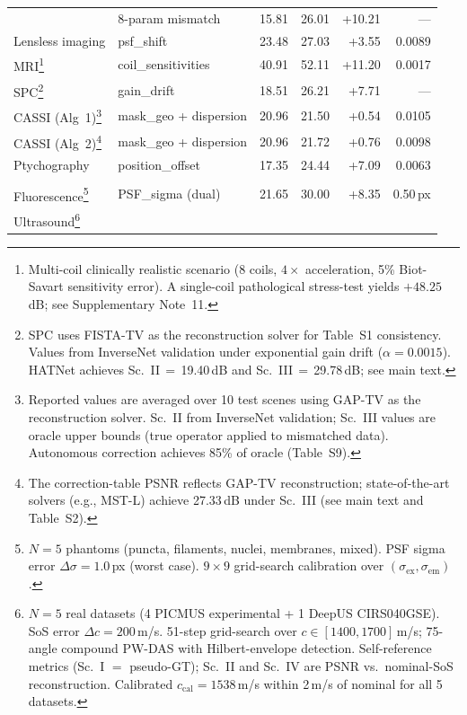 \documentclass[11pt]{article}
\begin{document}
\begin{longtable}{>{\raggedright}p{2.0cm} >{\raggedright}p{2.8cm}
                  r r r r}
  & 8-param mismatch
  & 15.81 & 26.01 & +10.21
  & --- \\
Lensless imaging
  & psf\_shift
  & 23.48 & 27.03 & +3.55
  & 0.0089 \\
MRI\footnote{Multi-coil clinically realistic scenario (8 coils, $4\times$ acceleration, 5\% Biot-Savart sensitivity error). A single-coil pathological stress-test yields $+48.25$\,dB; see Supplementary Note~11.}
  & coil\_sensitivities
  & 40.91 & 52.11 & +11.20
  & 0.0017 \\
SPC\footnote{SPC uses FISTA-TV as the reconstruction solver for Table~S1 consistency.  Values from InverseNet validation under exponential gain drift ($\alpha{=}0.0015$).  HATNet achieves Sc.~II$\,=\,$19.40\,dB and Sc.~III$\,=\,$29.78\,dB; see main text.}
  & gain\_drift
  & 18.51 & 26.21 & +7.71
  & --- \\
CASSI (Alg~1)\footnote{Reported values are averaged over 10 test scenes using GAP-TV as the reconstruction solver. Sc.~II from InverseNet validation; Sc.~III values are oracle upper bounds (true operator applied to mismatched data). Autonomous correction achieves 85\% of oracle (Table~S9).}
  & mask\_geo + dispersion
  & 20.96 & 21.50 & +0.54
  & 0.0105 \\
CASSI (Alg~2)\footnote{The correction-table PSNR reflects GAP-TV reconstruction; state-of-the-art solvers (e.g., MST-L) achieve 27.33\,dB under Sc.~III (see main text and Table~S2).}
  & mask\_geo + dispersion
  & 20.96 & 21.72 & +0.76
  & 0.0098 \\
Ptychography
  & position\_offset
  & 17.35 & 24.44 & +7.09
  & 0.0063 \\
\midrule
\multicolumn{6}{l}{\emph{Phase 2 validated additions (multi-phantom aggregate $\pm$ 95\% CI)}} \\
\midrule
Fluorescence\footnote{$N{=}5$ phantoms (puncta, filaments, nuclei, membranes, mixed). PSF sigma error $\Delta\sigma{=}1.0$\,px (worst case). $9 \times 9$ grid-search calibration over $(\sigma_{\mathrm{ex}}, \sigma_{\mathrm{em}})$.}
  & PSF\_sigma (dual)
  & 21.65 & 30.00 & +8.35
  & 0.50\,px \\
Ultrasound\footnote{$N{=}5$ real datasets (4 PICMUS experimental + 1 DeepUS CIRS040GSE). SoS error $\Delta c{=}200$\,m/s. 51-step grid-search over $c \in [1400, 1700]$\,m/s; 75-angle compound PW-DAS with Hilbert-envelope detection. Self-reference metrics (Sc.~I $=$ pseudo-GT); Sc.~II and Sc.~IV are PSNR vs.\ nominal-SoS reconstruction. Calibrated $c_{\mathrm{cal}}{=}1538$\,m/s within 2\,m/s of nominal for all 5 datasets.}

\end{longtable}
\end{document}
